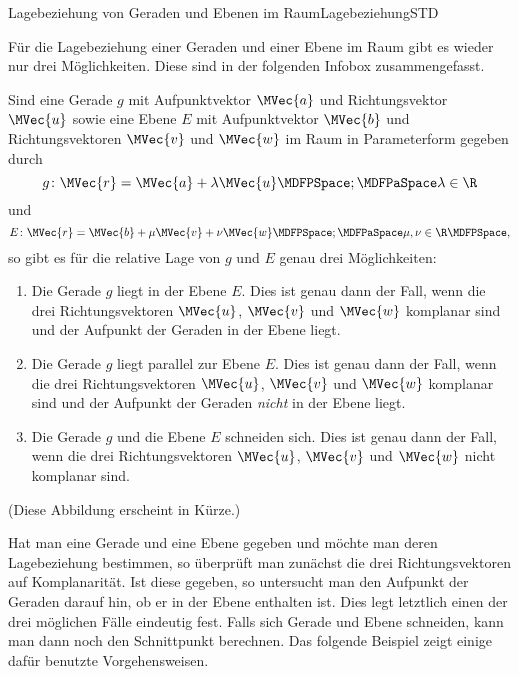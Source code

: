 \begin{MXContent}{Lagebeziehung von Geraden und Ebenen im Raum}{Lagebeziehung}{STD}
\begin{MExample}
\begin{itemize}
\end{itemize}
 
\end{MExample}

Für die Lagebeziehung einer Geraden und einer Ebene im Raum gibt es wieder nur drei Möglichkeiten. Diese sind in der folgenden Infobox zusammengefasst.

\begin{MInfo}
Sind eine Gerade $g$ mit Aufpunktvektor $\MVec{a}$ und Richtungsvektor $\MVec{u}$ sowie eine Ebene $E$ mit Aufpunktvektor $\MVec{b}$ und Richtungsvektoren $\MVec{v}$ und $\MVec{w}$ im Raum in Parameterform gegeben durch
\[
 g\colon\MVec{r}=\MVec{a}+\lambda\MVec{u}\MDFPSpace;\MDFPaSpace\lambda\in\R
\]
und
\[
 E\colon\MVec{r}=\MVec{b}+\mu\MVec{v}+\nu\MVec{w}\MDFPSpace;\MDFPaSpace\mu,\nu\in\R\MDFPSpace,
\]
so gibt es für die relative Lage von $g$ und $E$ genau drei Möglichkeiten:
\begin{enumerate}
 \item Die Gerade $g$ liegt in der Ebene $E$. Dies ist genau dann der Fall, wenn die drei Richtungsvektoren $\MVec{u}$, $\MVec{v}$ und $\MVec{w}$ komplanar sind und der Aufpunkt der Geraden in der Ebene liegt.
 \item Die Gerade $g$ liegt parallel zur Ebene $E$. Dies ist genau dann der Fall, wenn die drei Richtungsvektoren $\MVec{u}$, $\MVec{v}$ und $\MVec{w}$ komplanar sind und der Aufpunkt der Geraden \textit{nicht} in der Ebene liegt.
 \item Die Gerade $g$ und die Ebene $E$ schneiden sich. Dies ist genau dann der Fall, wenn die drei Richtungsvektoren $\MVec{u}$, $\MVec{v}$ und $\MVec{w}$ nicht komplanar sind.
\end{enumerate}

(Diese Abbildung erscheint in Kürze.)

\end{MInfo}

Hat man eine Gerade und eine Ebene gegeben und möchte man deren Lagebeziehung bestimmen, so überprüft man zunächst die drei Richtungsvektoren auf Komplanarität. Ist diese gegeben, so untersucht man den Aufpunkt der Geraden darauf hin, ob er in der Ebene enthalten ist. Dies legt letztlich einen der drei möglichen Fälle eindeutig fest. Falls sich Gerade und Ebene schneiden, kann man dann noch den Schnittpunkt berechnen. Das folgende Beispiel zeigt einige dafür benutzte Vorgehensweisen.


\end{MXContent}
